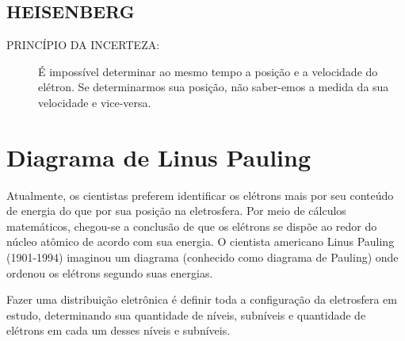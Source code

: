 \documentclass[10pt]{scrartcl}
\begin{document}
\subsection{HEISENBERG}
\label{sec:org5cff853}

\begin{description}
\item[{PRINCÍPIO  DA  INCERTEZA:}] É  impossível  determinar ao mesmo tempo a posição e a velocidade do elétron. Se determinarmos sua posição, não saber-emos a medida da sua velocidade e vice-versa.
\end{description}


\section{Diagrama de Linus Pauling}
\label{sec:org1c6dbe5}

Atualmente, os cientistas preferem identificar os elétrons mais por seu conteúdo de energia do que por sua posição na eletrosfera. Por meio de cálculos matemáticos, chegou-se a conclusão de que os elétrons se dispõe ao redor do núcleo atômico de acordo com sua energia.
  O cientista americano Linus Pauling (1901-1994) imaginou um diagrama (conhecido como diagrama de Pauling) onde ordenou os elétrons segundo suas energias.

Fazer uma distribuição eletrônica é definir toda a configuração da eletrosfera em estudo, determinando sua quantidade de níveis, subníveis e quantidade de elétrons em cada um desses níveis e subníveis.
\end{document}
